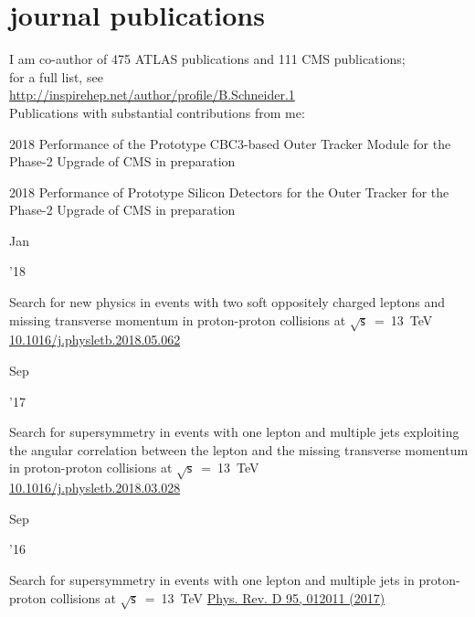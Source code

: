 \documentclass[]{cv} %
\begin{document}
\section{journal publications}
\begin{entrylist}

  \entry
  {}
  {I am co-author of 475 ATLAS publications and 111 CMS publications;\\
  for a full list, see \\
    \href{http://inspirehep.net/author/profile/B.Schneider.1}{http://inspirehep.net/author/profile/B.Schneider.1}\\
  Publications with substantial contributions from me:}
  {}
  {\vspace*{\spacingPubs}}

  \entry
  {2018}
  {Performance of the Prototype CBC3-based Outer Tracker Module for the Phase-2
  Upgrade of CMS}
  {in preparation}
  {\vspace*{\spacingPubs}}

  \entry
  {2018}
  {Performance of Prototype Silicon Detectors for the Outer Tracker for the
  Phase-2 Upgrade of CMS}
  {in preparation}
  {\vspace*{\spacingPubs}}

  \entry
  {\parbox[t]{\parboxWidthOne}{Jan}\parbox[t]{\parboxWidthTwo}{\hfill '18}}
  {Search for new physics in events with two soft oppositely charged leptons and missing transverse momentum in proton-proton collisions at $\sqrt{\mathsf{s}}$~=~13~TeV}
    {\href{https://www.sciencedirect.com/science/article/pii/S037026931830426X}{10.1016/j.physletb.2018.05.062}}
  {\vspace*{\spacingPubs}}

  \entry
  {\parbox[t]{\parboxWidthOne}{Sep}\parbox[t]{\parboxWidthTwo}{\hfill '17}}
  {Search for supersymmetry in events with one lepton and multiple jets exploiting the angular correlation between the lepton and the missing transverse momentum in proton-proton collisions at $\sqrt{\mathsf{s}}$~=~13~TeV\\}
    {\href{http://dx.doi.org/10.1016/j.physletb.2018.03.028}{10.1016/j.physletb.2018.03.028}}
  {\vspace*{\spacingPubs}}

  \entry
  {\parbox[t]{\parboxWidthOne}{Sep}\parbox[t]{\parboxWidthTwo}{\hfill '16}}
  {Search for supersymmetry in events with one lepton and multiple jets in proton-proton collisions at $\sqrt{\mathsf{s}}$~=~13~TeV}
    {\href{https://journals.aps.org/prd/abstract/10.1103/PhysRevD.95.012011}{Phys. Rev. D 95, 012011 (2017)}}
  {\vspace*{\spacingPubs}}


\end{entrylist}
\end{document}

